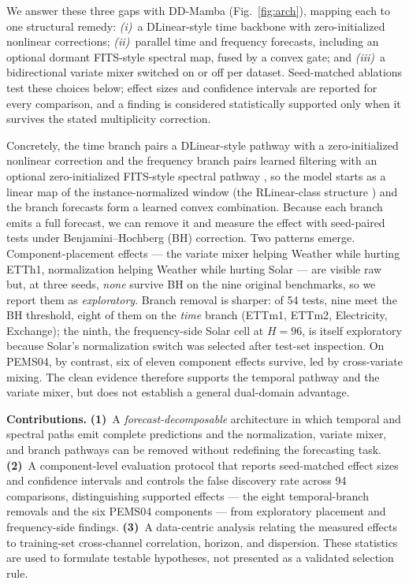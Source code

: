 \documentclass[review,12pt]{elsarticle}
\newcommand{\model}{DD-Mamba}
\begin{document}
We answer these three gaps with \model{} (Fig.~\ref{fig:arch}), mapping
each to one structural remedy: \emph{(i)}~a DLinear-style time backbone with
zero-initialized nonlinear corrections; \emph{(ii)}~parallel time and
frequency forecasts, including an optional dormant FITS-style spectral map,
fused by a convex gate; and \emph{(iii)}~a bidirectional variate mixer
switched on or off per dataset. Seed-matched ablations test these choices
below; effect sizes and confidence intervals are reported for every
comparison, and a finding is considered statistically supported only when
it survives the stated multiplicity correction.

Concretely, the time branch pairs a DLinear-style pathway \cite{dlinear}
with a zero-initialized nonlinear correction and the frequency branch pairs
learned filtering with an optional zero-initialized FITS-style spectral
pathway \cite{fits}, so the model starts as a linear map of the
instance-normalized window (the RLinear-class structure \cite{rlinear,revin})
and the branch forecasts form a learned convex combination. Because each
branch emits a full forecast, we can remove it and measure the effect with
seed-paired tests under Benjamini--Hochberg (BH) correction. Two patterns
emerge. Component-placement effects --- the variate mixer helping Weather
while hurting ETTh1, normalization helping Weather while hurting Solar ---
are visible raw but, at three seeds, \emph{none} survive BH on the nine
original benchmarks, so we report them as \emph{exploratory}. Branch removal
is sharper: of 54 tests, nine meet the BH threshold, eight of them on the
\emph{time} branch (ETTm1, ETTm2, Electricity, Exchange); the ninth, the
frequency-side Solar cell at $H{=}96$, is itself exploratory because Solar's
normalization switch was selected after test-set inspection. On PEMS04, by
contrast, six of eleven component effects survive, led by cross-variate
mixing. The clean evidence therefore supports the temporal pathway and the
variate mixer, but does not establish a general dual-domain advantage.

\noindent\textbf{Contributions.} \textbf{(1)}~A
\emph{forecast-decomposable} architecture in which temporal and spectral
paths emit complete predictions and the normalization, variate mixer, and
branch pathways can be removed without redefining the forecasting task.
\textbf{(2)}~A component-level evaluation protocol that reports
seed-matched effect sizes and confidence intervals and controls the false
discovery rate across 94 comparisons, distinguishing supported effects ---
the eight temporal-branch removals and the six PEMS04 components --- from
exploratory placement and frequency-side findings. \textbf{(3)}~A data-centric analysis relating the
measured effects to training-set cross-channel correlation, horizon, and
dispersion. These statistics are used to formulate testable hypotheses,
not presented as a validated selection rule.
\end{document}
